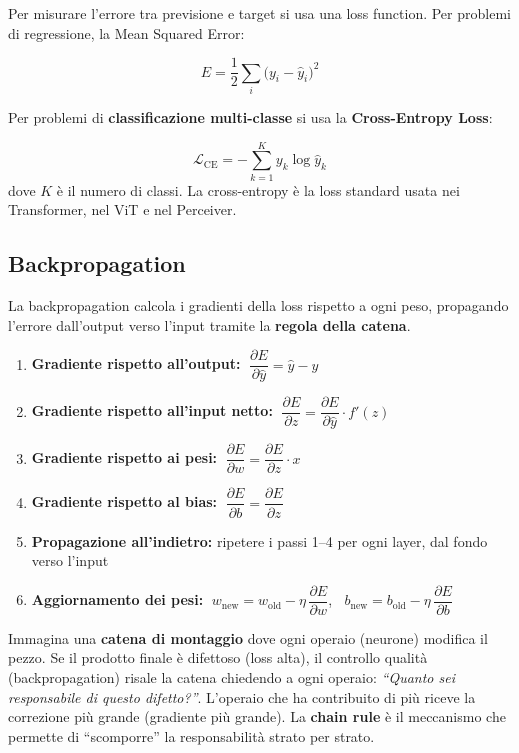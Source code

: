 \documentclass[
  11pt,
]{article}
\begin{document}
Per misurare l'errore tra previsione e target si usa una loss function. Per problemi di regressione, la Mean Squared Error:

\begin{formulabox}[title={\textbf{Mean Squared Error}}]
\[
E = \frac{1}{2}\sum_{i}\bigl(y_i - \hat{y}_i\bigr)^{2}
\]
\end{formulabox}

Per problemi di \textbf{classificazione multi-classe} si usa la \textbf{Cross-Entropy Loss}:

\[
\mathcal{L}_{\text{CE}} = -\sum_{k=1}^{K} y_k \log \hat{y}_k
\]
dove $K$ è il numero di classi. La cross-entropy è la loss standard usata nei Transformer, nel ViT e nel Perceiver.

\subsection{Backpropagation}
\label{app:backprop}

La backpropagation calcola i gradienti della loss rispetto a ogni peso, propagando l'errore dall'output verso l'input tramite la \textbf{regola della catena}.

\begin{formulabox}[title={\textbf{I 6 passi della Backpropagation}}]
\begin{enumerate}
\item \textbf{Gradiente rispetto all'output:} $\;\dfrac{\partial E}{\partial \hat{y}} = \hat{y} - y$
\item \textbf{Gradiente rispetto all'input netto:} $\;\dfrac{\partial E}{\partial z} = \dfrac{\partial E}{\partial \hat{y}} \cdot f'(z)$
\item \textbf{Gradiente rispetto ai pesi:} $\;\dfrac{\partial E}{\partial w} = \dfrac{\partial E}{\partial z} \cdot x$
\item \textbf{Gradiente rispetto al bias:} $\;\dfrac{\partial E}{\partial b} = \dfrac{\partial E}{\partial z}$
\item \textbf{Propagazione all'indietro:} ripetere i passi 1--4 per ogni layer, dal fondo verso l'input
\item \textbf{Aggiornamento dei pesi:} $\;w_{\text{new}} = w_{\text{old}} - \eta \,\dfrac{\partial E}{\partial w}$, $\;\;b_{\text{new}} = b_{\text{old}} - \eta \,\dfrac{\partial E}{\partial b}$
\end{enumerate}
\end{formulabox}

\begin{notabox}[title={\textbf{In parole semplici: la backpropagation come catena di montaggio}}]
Immagina una \textbf{catena di montaggio} dove ogni operaio (neurone) modifica il pezzo. Se il prodotto finale è difettoso (loss alta), il controllo qualità (backpropagation) risale la catena chiedendo a ogni operaio: \emph{``Quanto sei responsabile di questo difetto?''}. L'operaio che ha contribuito di più riceve la correzione più grande (gradiente più grande). La \textbf{chain rule} è il meccanismo che permette di ``scomporre'' la responsabilità strato per strato.
\end{notabox}
\end{document}
